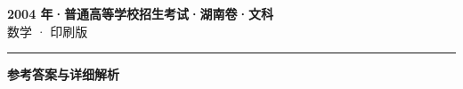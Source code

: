 \documentclass[zihao=5, a4paper]{ctexart}
\begin{document}
\begin{center}
  {\Large\bfseries 2004 年·普通高等学校招生考试·湖南卷·文科}\\[4pt]
  {\large 数学 · 印刷版}
\end{center}
\medskip
{}

\par\bigskip\hrule\bigskip
{}
\begin{center}{\large\bfseries 参考答案与详细解析}\end{center}
\smallskip

\end{document}
